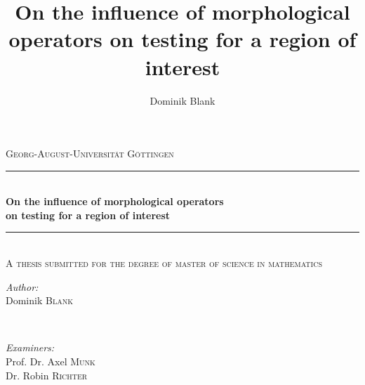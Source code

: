 \documentclass[a4paper,12pt]{article}
\author{Dominik Blank}
\title{On the influence of morphological operators on testing for a region of interest}
\theoremstyle{plain}
\theoremstyle{definition}
\begin{document}
\begin{titlepage}

\newcommand{\HRule}{\rule{\linewidth}{0.5mm}} %

\center %
 

\textsc{\Large Georg-August-Universität Göttingen}\\[1.5cm] %


\HRule \\[0.4cm]
{\large \bfseries On the influence of morphological operators\\ on testing for a region of interest}\\[0.2cm] %
\HRule \\[1cm]
\textsc{\large A thesis submitted for the degree of master of science in mathematics}\\[2cm] %


\begin{minipage}[t]{0.3\textwidth}
\begin{flushleft} \large
\emph{Author:}\\
Dominik \textsc{Blank}
\end{flushleft}
\end{minipage}
~
\begin{minipage}[t]{0.6\textwidth}
\begin{flushright} \large
\emph{Examiners:} \\
Prof. Dr. Axel \textsc{Munk}\\
Dr. Robin \textsc{Richter}
\end{flushright}
\end{minipage}\\[4cm]


\end{titlepage}
\end{document}
